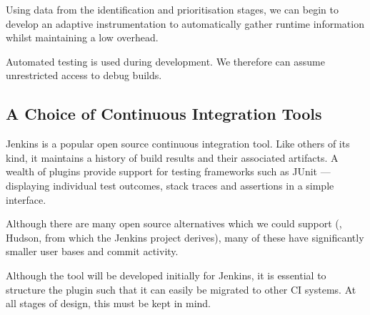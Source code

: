 Using data from the identification and prioritisation stages, we can begin to
develop an adaptive instrumentation to automatically gather runtime information
whilst maintaining a low overhead.

Automated testing is used during development. We therefore can assume
unrestricted access to debug builds.


\subsection{A Choice of Continuous Integration Tools}

Jenkins \cite{Jenkins} is a popular open source continuous integration tool.
Like others of its kind, it maintains a history of build results and their
associated artifacts. A wealth of plugins provide support for testing frameworks
such as JUnit --- displaying individual test outcomes, stack traces and
assertions in a simple interface.

Although there are many open source alternatives which we could support (\eg,
Hudson, from which the Jenkins project derives), many of these have
significantly smaller user bases and commit activity.

Although the tool will be developed initially for Jenkins, it is essential to
structure the plugin such that it can easily be migrated to other CI systems. At
all stages of design, this must be kept in mind.
